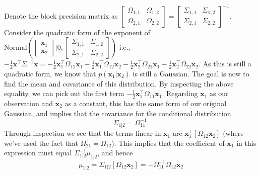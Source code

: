 \documentclass[12pt]{article}
\begin{document}
Denote the block precision matrix as 
$ \left[ \begin{smallmatrix} \Omega_{1,1}& \Omega_{1,2} \\ \Omega_{2,1} & \Omega_{2,2} \end{smallmatrix} \right] = 
\left[ \begin{smallmatrix} \Sigma_{1,1}& \Sigma_{1,2} \\ \Sigma_{2,1} & \Sigma_{2,2} \end{smallmatrix} \right]^{-1} $.
Consider the quadratic form of the exponent of 
$\text{Normal} \left( \left[ \begin{smallmatrix} \textbf{x}_1 \\ \textbf{x}_2 \end{smallmatrix} \right] | 0, \left[ \begin{smallmatrix} \Sigma_{1,1}& \Sigma_{1,2} \\ \Sigma_{2,1} & \Sigma_{2,2} \end{smallmatrix} \right] \right)$
i.e., $-\frac{1}{2} \textbf{x}^{\top} \Sigma^{-1} \textbf{x} = 
-\frac{1}{2} \textbf{x}_1^{\top} \Omega_{11} \textbf{x}_1 
-\frac{1}{2} \textbf{x}_1^{\top} \Omega_{12} \textbf{x}_2   
-\frac{1}{2} \textbf{x}_2^{\top} \Omega_{21} \textbf{x}_1 
-\frac{1}{2} \textbf{x}_2^{\top} \Omega_{22} \textbf{x}_2
$. As this is still a quadratic form, we know that $p(\textbf{x}_1 | \textbf{x}_2)$ is still a Gaussian. The goal is now to find the mean and covariance of this distribution.
By inspecting the above equality, we can pick out the first term 
$-\frac{1}{2} \textbf{x}_1^{\top} \Omega_{11} \textbf{x}_1$. Regarding $\textbf{x}_1$ as our observation and $\textbf{x}_2$ as a constant, this has the same form of our original Gaussian, 
and implies that the covariance for the conditional distribution 
\begin{equation}
    \Sigma_{1|2} = \Omega_{11}^{-1}.
\end{equation}
Through inspection we see that the terms linear in $\textbf{x}_1$ are 
$\textbf{x}_1^{\top}[\Omega_{12}\textbf{x}_2]$ (where we've used the fact that $\Omega_{21}^{\top} = \Omega_{12}$).
This implies that the coefficient of $\textbf{x}_1$ in this expression must equal $\Sigma_{1|2}^{-1} \mu_{1|2}$, and hence
\begin{equation}
    \mu_{1|2} = \Sigma_{1|2}[\Omega_{12}\textbf{x}_2] = - \Omega_{11}^{-1} \Omega_{12} \textbf{x}_2
\end{equation}
\end{document}
